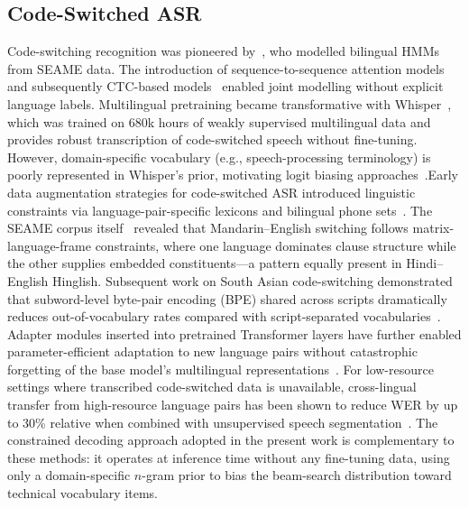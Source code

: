 \documentclass[10pt,twocolumn]{article}
\begin{document}
\subsection{Code-Switched ASR}
Code-switching recognition was pioneered by~\cite{vu2012first}, who modelled bilingual HMMs from SEAME data. The introduction of sequence-to-sequence attention models~\cite{chan2016listen} and subsequently CTC-based models~\cite{graves2006connectionist} enabled joint modelling without explicit language labels. Multilingual pretraining became transformative with Whisper~\cite{radford2023robust}, which was trained on 680k hours of weakly supervised multilingual data and provides robust transcription of code-switched speech without fine-tuning. However, domain-specific vocabulary (e.g., speech-processing terminology) is poorly represented in Whisper's prior, motivating logit biasing approaches~\cite{chen2024hyporadise}.Early data augmentation strategies for code-switched ASR introduced
linguistic constraints via language-pair-specific lexicons and
bilingual phone sets~\cite{li2011asymmetric}. The SEAME corpus
itself~\cite{lyu2015mandarin} revealed that Mandarin--English
switching follows matrix-language-frame constraints, where one
language dominates clause structure while the other supplies
embedded constituents---a pattern equally present in
Hindi--English Hinglish. Subsequent work on South Asian
code-switching demonstrated that subword-level byte-pair encoding
(BPE) shared across scripts dramatically reduces out-of-vocabulary
rates compared with script-separated vocabularies~\cite{winata2021language}.
Adapter modules inserted into pretrained Transformer layers have
further enabled parameter-efficient adaptation to new language pairs
without catastrophic forgetting of the base model's multilingual
representations~\cite{thomas2022efficient}. For low-resource
settings where transcribed code-switched data is unavailable,
cross-lingual transfer from high-resource language pairs has been
shown to reduce WER by up to 30\% relative when combined with
unsupervised speech segmentation~\cite{yi2020applying}. The
constrained decoding approach adopted in the present work is
complementary to these methods: it operates at inference time
without any fine-tuning data, using only a domain-specific $n$-gram
prior to bias the beam-search distribution toward technical
vocabulary items.
\end{document}
